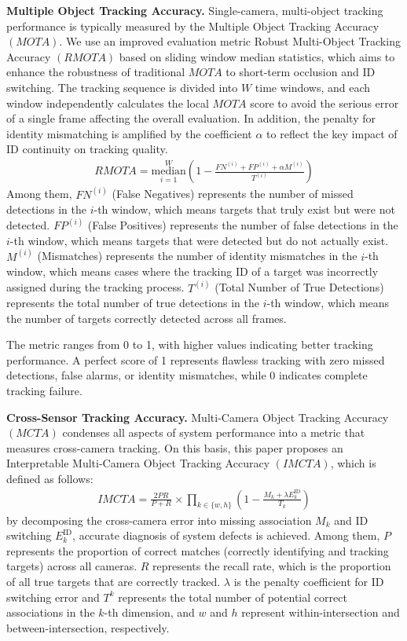 \documentclass[journal,twoside,web]{ieeecolor}
\begin{document}
\textbf{Multiple Object Tracking Accuracy.}
Single-camera, multi-object tracking performance is typically measured by the Multiple Object Tracking Accuracy \((MOTA)\)\cite{Alpher23b}.
We use an improved evaluation metric Robust Multi-Object Tracking Accuracy \((RMOTA)\) based on sliding window median statistics, which aims to enhance the robustness of traditional \(MOTA\) to short-term occlusion and ID switching.
The tracking sequence is divided into \(W\) time windows, and each window independently calculates the local \(MOTA\) score to avoid the serious error of a single frame affecting the overall evaluation.
In addition, the penalty for identity mismatching is amplified by the coefficient \(\alpha\) to reflect the key impact of ID continuity on tracking quality.
\begin{align}
	RMOTA = \underset{i=1}{\overset{W}{\mathrm{median}}} \left(1 - \frac{FN^{(i)} + FP^{(i)} + \alpha M^{(i)}}{T^{(i)}}\right) 
\end{align}
Among them,
\(FN^{(i)}\) (False Negatives) represents the number of missed detections in the \(i\)-th window, which means targets that truly exist but were not detected.
\(FP^{(i)}\) (False Positives) represents the number of false detections in the \(i\)-th window, which means targets that were detected but do not actually exist.
\(M^{(i)}\) (Mismatches) represents the number of identity mismatches in the \(i\)-th window, which means cases where the tracking ID of a target was incorrectly assigned during the tracking process.
\(T^{(i)}\) (Total Number of True Detections) represents the total number of true detections in the \(i\)-th window, which means the number of targets correctly detected across all frames.

The metric ranges from 0 to 1, with higher values indicating better tracking performance. 
A perfect score of 1 represents flawless tracking with zero missed detections, false alarms, or identity mismatches, while 0 indicates complete tracking failure.

\textbf{Cross-Sensor Tracking Accuracy.}
Multi-Camera Object Tracking Accuracy \((MCTA)\)\cite{Alpher23b} condenses all aspects of system performance into a metric that measures cross-camera tracking.
On this basis, this paper proposes an Interpretable Multi-Camera Object Tracking Accuracy \((IMCTA)\), which is defined as follows:
\begin{align}
	IMCTA = {\frac{2PR}{P + R}}_{\text{}} \times \prod_{k \in \{w, h\}} \left(1 - \frac{M_k + \lambda E_k^{\text{ID}}}{T_k}\right)
\end{align}
by decomposing the cross-camera error into missing association \(M_k\) and ID switching \(E_k^{\text{ID}}\), accurate diagnosis of system defects is achieved.
Among them,
\(P\) represents the proportion of correct matches (correctly identifying and tracking targets) across all cameras.  
\(R\) represents the recall rate, which is the proportion of all true targets that are correctly tracked.  
\(\lambda\) is the penalty coefficient for ID switching error and \(T^{k}\) represents the total number of potential correct associations in the \(k\)-th dimension, and \(w\) and \(h\) represent within-intersection and between-intersection, respectively.
\end{document}
